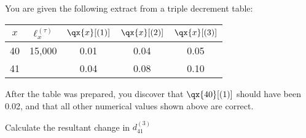 You are given the following extract from a triple decrement table:
\begin{center}\begin{tabular}{c|cccc}  
    $x$ & $\ell_x^{(\tau)}$ & $\qx{x}[(1)]$ & $\qx{x}[(2)]$  & $\qx{x}[(3)]$  \\ \hline
   40 & 15,000 & 0.01 & 0.04 & 0.05 \\ 
   41 & \underline{\hspace{0.25in}}  & 0.04 & 0.08 & 0.10 
\end{tabular}\end{center}
After the table was prepared, you discover that $\qx{40}[(1)]$
should have been 0.02, and that all other numerical values shown above are correct.

\smallskip
Calculate the resultant change in $d_{41}^{(3)}$

